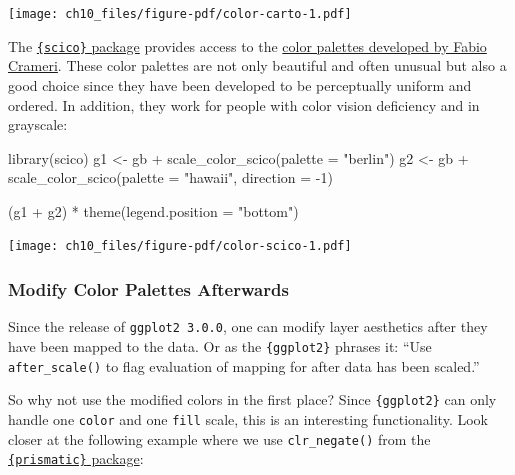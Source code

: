 \documentclass[
  letterpaper,
]{scrbook}
\newenvironment{Shaded}{\begin{snugshade}}{\end{snugshade}}
\newcommand{\AttributeTok}[1]{\textcolor[rgb]{0.40,0.45,0.13}{#1}}
\newcommand{\DecValTok}[1]{\textcolor[rgb]{0.68,0.00,0.00}{#1}}
\newcommand{\FunctionTok}[1]{\textcolor[rgb]{0.28,0.35,0.67}{#1}}
\newcommand{\NormalTok}[1]{\textcolor[rgb]{0.00,0.23,0.31}{#1}}
\newcommand{\OtherTok}[1]{\textcolor[rgb]{0.00,0.23,0.31}{#1}}
\newcommand{\SpecialCharTok}[1]{\textcolor[rgb]{0.37,0.37,0.37}{#1}}
\newcommand{\StringTok}[1]{\textcolor[rgb]{0.13,0.47,0.30}{#1}}
\begin{document}
\texttt{[image: ch10\_files/figure-pdf/color-carto-1.pdf]}

The \href{https://github.com/thomasp85/scico}{\texttt{\{scico\}}
package} provides access to the
\href{http://www.fabiocrameri.ch/colourmaps.php}{color palettes
developed by Fabio Crameri}. These color palettes are not only beautiful
and often unusual but also a good choice since they have been developed
to be perceptually uniform and ordered. In addition, they work for
people with color vision deficiency and in grayscale:

\begin{Shaded}
\begin{Highlighting}[]
\FunctionTok{library}\NormalTok{(scico)}
\NormalTok{g1 }\OtherTok{\textless{}{-}}\NormalTok{ gb }\SpecialCharTok{+} \FunctionTok{scale\_color\_scico}\NormalTok{(}\AttributeTok{palette =} \StringTok{"berlin"}\NormalTok{)}
\NormalTok{g2 }\OtherTok{\textless{}{-}}\NormalTok{ gb }\SpecialCharTok{+} \FunctionTok{scale\_color\_scico}\NormalTok{(}\AttributeTok{palette =} \StringTok{"hawaii"}\NormalTok{, }\AttributeTok{direction =} \SpecialCharTok{{-}}\DecValTok{1}\NormalTok{)}

\NormalTok{(g1 }\SpecialCharTok{+}\NormalTok{ g2) }\SpecialCharTok{*} \FunctionTok{theme}\NormalTok{(}\AttributeTok{legend.position =} \StringTok{"bottom"}\NormalTok{)}
\end{Highlighting}
\end{Shaded}

\texttt{[image: ch10\_files/figure-pdf/color-scico-1.pdf]}

\subsubsection{Modify Color Palettes
Afterwards}\label{modify-color-palettes-afterwards}

Since the release of \texttt{ggplot2\ 3.0.0}, one can modify layer
aesthetics after they have been mapped to the data. Or as the
\texttt{\{ggplot2\}} phrases it: ``Use \texttt{after\_scale()} to flag
evaluation of mapping for after data has been scaled.''

So why not use the modified colors in the first place? Since
\texttt{\{ggplot2\}} can only handle one \texttt{color} and one
\texttt{fill} scale, this is an interesting functionality. Look closer
at the following example where we use \texttt{clr\_negate()} from the
\href{https://emilhvitfeldt.github.io/prismatic/}{\texttt{\{prismatic\}}
package}:
\end{document}
